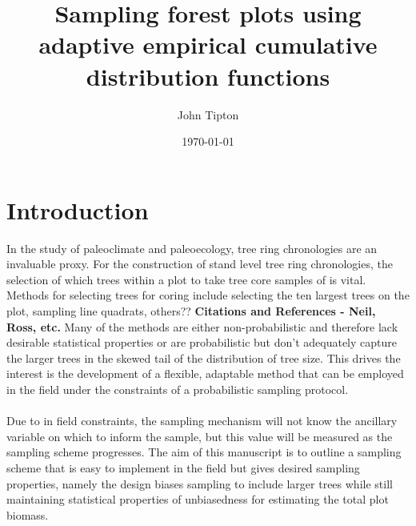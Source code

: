 \documentclass[fleqn]{article}
\title{Sampling forest plots using adaptive empirical cumulative distribution functions}
\author{John Tipton}
\date{\today}
\begin{document}
\maketitle
%
\section{Introduction}
  In the study of paleoclimate and paleoecology, tree ring chronologies are an invaluable proxy. For the construction of stand level tree ring chronologies, the selection of which trees within a plot to take tree core samples of is vital. Methods for selecting trees for coring include selecting the ten largest trees on the plot, sampling line quadrats, others?? \textbf{Citations and References - Neil, Ross, etc.} Many of the methods are either non-probabilistic and therefore lack desirable statistical properties or are probabilistic but don't adequately capture the larger trees in the skewed tail of the distribution of tree size. This drives the interest is the development of a flexible, adaptable method that can be employed in the field under the constraints of a probabilistic sampling protocol.\\
\\
  Due to in field constraints, the sampling mechanism will not know the ancillary variable on which to inform the sample, but this value will be measured as the sampling scheme progresses. The aim of this manuscript is to outline a sampling scheme that is easy to implement in the field but gives desired sampling properties, namely the design biases sampling to include larger trees while still maintaining statistical properties of unbiasedness for estimating the total plot biomass.
%
\end{document}
